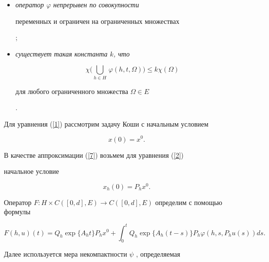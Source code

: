 \begin{itemize}


\item[$\mathrm A_2)$] {\it оператор $\varphi$ непрерывен по совокупности 


переменных и ограничен на ограниченных множествах}; 


\item[$\mathrm A_3)$] {\it существует такая константа $k$, что 


$$


\chi\Big(\bigcup\limits_{h\in H}\, \varphi(h,t,\Omega)\Big)


\le k\chi(\Omega)


$$


для любого ограниченного множества $\Omega \in E$}.


\end{itemize}





Для уравнения (\ref{1}) рассмотрим задачу Коши с начальным условием 


\begin{equation}\label{7}


x(0) =x^0.


\end{equation}





В качестве аппроксимации (\ref{7}) возьмем для уравнения (\ref{2}) 


начальное условие


\begin{equation}\label{8}


x_h (0) =P_h x^0.


\end{equation}





Оператор $F: H\times C([0,d],E)\to C([0,d],E)$ определим с помощью формулы


\begin{equation}\label{9}


F(h,u)(t)=Q_h \exp\{A_h t\}P_h x^0


+\int_0^t Q_h \exp\{A_h (t-s)\}P_h \varphi(h,s,P_h u(s))ds.


\end{equation}





Далее используется мера некомпактности $\psi$ \cite{6}, определяемая 


